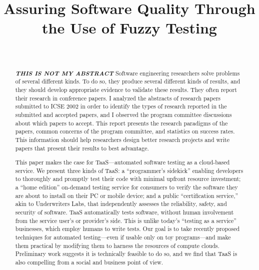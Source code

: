 \documentclass[10pt, final, journal, letterpaper, twoside, twocolumn]{IEEEtran}
\begin{document}
\title{Assuring Software Quality Through the Use of Fuzzy Testing}
\author{ \\
	}

\maketitle


\begin{abstract}
	\textbf{\textit{THIS IS NOT MY ABSTRACT}} Software engineering researchers solve problems of several different kinds. To do so, they produce  several different kinds of results, and they should develop appropriate evidence to validate these results. They often report their research in conference papers. I analyzed the abstracts of research papers submitted to ICSE 2002 in order to identify the types of research reported in the submitted and accepted papers, and I observed the program committee discussions about which papers to accept. This report presents the research paradigms of the papers, common concerns of the program committee, and statistics on success rates. This information should help researchers design better research projects and write papers that present their results to best advantage. 
	
	This paper makes the case for TaaS—automated software testing as a cloud-based service. We present three kinds of TaaS: a “programmer’s sidekick” enabling developers to thoroughly and promptly test their code with minimal upfront resource investment; a “home edition” on-demand testing service for consumers to verify the software they are about to install on their PC or mobile device; and a public “certification service,” akin to Underwriters Labs, that independently assesses the reliability, safety, and security of software.
	TaaS automatically tests software, without human involvement from the service user’s or provider’s side. This is unlike today’s “testing as a service” businesses, which employ humans to write tests. Our goal is to take recently proposed techniques for automated testing—even if usable only on toy programs—and make them practical by modifying them to harness the resources of compute clouds. Preliminary work suggests it is technically feasible to do so, and we find that TaaS is also compelling from a social and business point of view.
\end{abstract}
\end{document}
